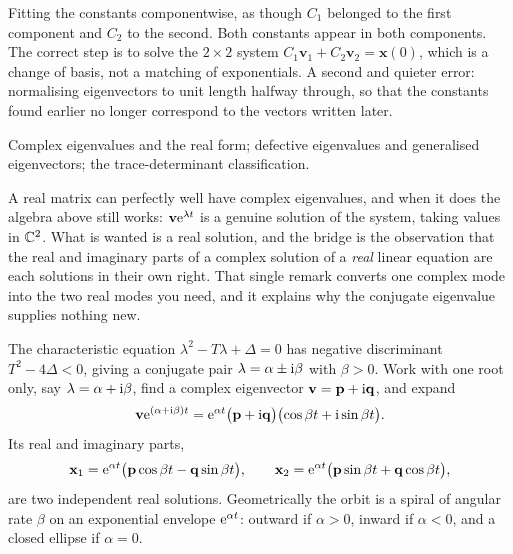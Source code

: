 \begin{trap}
Fitting the constants componentwise, as though $C_1$ belonged to the first component and $C_2$ to the second. Both constants appear in both components. The correct step is to solve the $2\times2$ system $C_1\mathbf{v}_1+C_2\mathbf{v}_2=\mathbf{x}(0)$, which is a change of basis, not a matching of exponentials. A second and quieter error: normalising eigenvectors to unit length halfway through, so that the constants found earlier no longer correspond to the vectors written later.
\end{trap}

\begin{seealsob}Complex eigenvalues and the real form; defective eigenvalues and generalised eigenvectors; the trace-determinant classification.\end{seealsob}

A real matrix can perfectly well have complex eigenvalues, and when it does the algebra above still works: $\mathbf{v}\mathrm{e}^{\lambda t}$ is a genuine solution of the system, taking values in $\mathbb{C}^{2}$. What is wanted is a real solution, and the bridge is the observation that the real and imaginary parts of a complex solution of a \emph{real} linear equation are each solutions in their own right. That single remark converts one complex mode into the two real modes you need, and it explains why the conjugate eigenvalue supplies nothing new.

\cue The characteristic equation $\lambda^{2}-T\lambda+\Delta=0$ has negative discriminant $T^{2}-4\Delta<0$, giving a conjugate pair $\lambda=\alpha\pm\mathrm{i}\beta$ with $\beta>0$.
\method Work with one root only, say $\lambda=\alpha+\mathrm{i}\beta$, find a complex eigenvector $\mathbf{v}=\mathbf{p}+\mathrm{i}\mathbf{q}$, and expand
\[\mathbf{v}\mathrm{e}^{(\alpha+\mathrm{i}\beta)t}=\mathrm{e}^{\alpha t}\bigl(\mathbf{p}+\mathrm{i}\mathbf{q}\bigr)\bigl(\cos\beta t+\mathrm{i}\sin\beta t\bigr).\]
Its real and imaginary parts,
\[\mathbf{x}_1=\mathrm{e}^{\alpha t}\bigl(\mathbf{p}\cos\beta t-\mathbf{q}\sin\beta t\bigr),\qquad
\mathbf{x}_2=\mathrm{e}^{\alpha t}\bigl(\mathbf{p}\sin\beta t+\mathbf{q}\cos\beta t\bigr),\]
are two independent real solutions. Geometrically the orbit is a spiral of angular rate $\beta$ on an exponential envelope $\mathrm{e}^{\alpha t}$: outward if $\alpha>0$, inward if $\alpha<0$, and a closed ellipse if $\alpha=0$.

